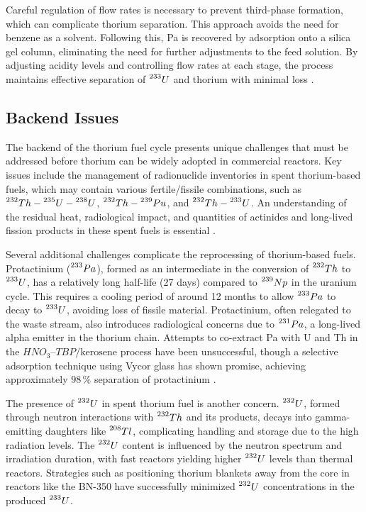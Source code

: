 Careful regulation of flow rates is necessary to prevent third-phase formation, which can complicate thorium separation. This approach avoids the need for benzene as a solvent. Following this, Pa is recovered by adsorption onto a silica gel column, eliminating the need for further adjustments to the feed solution. By adjusting acidity levels and controlling flow rates at each stage, the process maintains effective separation of \(\prescript{233}{}{U}\) and thorium with minimal loss \cite{fuel_cycle_book}.

\subsection{Backend Issues}

The backend of the thorium fuel cycle presents unique challenges that must be addressed before thorium can be widely adopted in commercial reactors. Key issues include the management of radionuclide inventories in spent thorium-based fuels, which may contain various fertile/fissile combinations, such as \(\prescript{232}{}{Th}-\prescript{235}{}{U}-\prescript{238}{}{U}\), \(\prescript{232}{}{Th}-\prescript{239}{}{Pu}\), and \(\prescript{232}{}{Th}-\prescript{233}{}{U}\). An understanding of the residual heat, radiological impact, and quantities of actinides and long-lived fission products in these spent fuels is essential \cite{IAEA_Th_Potential}.

Several additional challenges complicate the reprocessing of thorium-based fuels. Protactinium (\(\prescript{233}{}{Pa}\)), formed as an intermediate in the conversion of \(\prescript{232}{}{Th}\) to \(\prescript{233}{}{U}\), has a relatively long half-life (27 days) compared to \(\prescript{239}{}{Np}\) in the uranium cycle. This requires a cooling period of around 12 months to allow \(\prescript{233}{}{Pa}\) to decay to \(\prescript{233}{}{U}\), avoiding loss of fissile material. Protactinium, often relegated to the waste stream, also introduces radiological concerns due to \(\prescript{231}{}{Pa}\), a long-lived alpha emitter in the thorium chain. Attempts to co-extract Pa with U and Th in the \(HNO_3–TBP/\text{kerosene}\) process have been unsuccessful, though a selective adsorption technique using Vycor glass has shown promise, achieving approximately \(98 \, \%\) separation of protactinium \cite{IAEA_Th_Potential}.

The presence of \(\prescript{232}{}{U}\) in spent thorium fuel is another concern. \(\prescript{232}{}{U}\), formed through neutron interactions with \(\prescript{232}{}{Th}\) and its products, decays into gamma-emitting daughters like \(\prescript{208}{}{Tl}\), complicating handling and storage due to the high radiation levels. The \(\prescript{232}{}{U}\) content is influenced by the neutron spectrum and irradiation duration, with fast reactors yielding higher \(\prescript{232}{}{U}\) levels than thermal reactors. Strategies such as positioning thorium blankets away from the core in reactors like the BN-350 have successfully minimized \(\prescript{232}{}{U}\) concentrations in the produced \(\prescript{233}{}{U}\).

